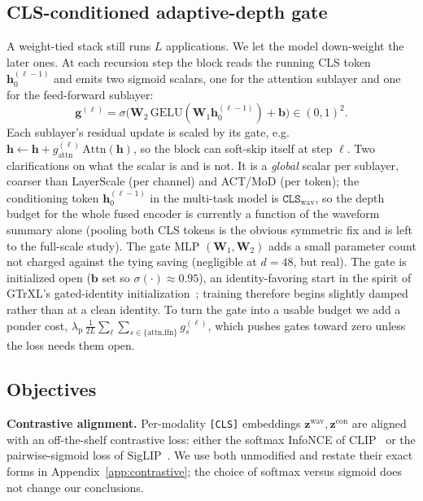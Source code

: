 \documentclass[conference]{IEEEtran}
\begin{document}
\subsection{CLS-conditioned adaptive-depth gate}
A weight-tied stack still runs $L$ applications. We let the model down-weight the
later ones. At each recursion step the block reads the running CLS token
$\bm{h}^{(\ell-1)}_{0}$ and emits two sigmoid scalars, one for the attention
sublayer and one for the feed-forward sublayer:
\begin{equation}
\bm{g}^{(\ell)} = \sigma\!\big(\mathbf{W}_2\,\mathrm{GELU}(\mathbf{W}_1 \bm{h}^{(\ell-1)}_{0}) + \bm{b}\big) \in (0,1)^2 .
\end{equation}
Each sublayer's residual update is scaled by its gate, e.g.
$\bm{h} \leftarrow \bm{h} + g^{(\ell)}_{\text{attn}}\,\mathrm{Attn}(\bm{h})$, so the
block can soft-skip itself at step $\ell$. Two clarifications on what the scalar
is and is not. It is a \emph{global} scalar per sublayer, coarser than LayerScale
(per channel) and ACT/MoD (per token); the conditioning token
$\bm{h}^{(\ell-1)}_{0}$ in the multi-task model is $\texttt{CLS}_{\text{wav}}$,
so the depth budget for the whole fused encoder is currently a function of the
waveform summary alone (pooling both CLS tokens is the obvious symmetric fix and is
left to the full-scale study). The gate MLP $(\mathbf{W}_1,\mathbf{W}_2)$ adds a
small parameter count not charged against the tying saving (negligible at
$d{=}48$, but real). The gate is initialized open ($\bm{b}$ set so
$\sigma(\cdot)\approx 0.95$), an identity-favoring start in the spirit of GTrXL's
gated-identity initialization~\cite{gtrxl}; training therefore begins slightly
damped rather than at a clean identity. To turn the gate into a usable budget we add a ponder cost,
$\lambda_{\text{p}}\,\frac{1}{2L}\sum_{\ell}\!\sum_{s\in\{\text{attn,ffn}\}} g^{(\ell)}_{s}$,
which pushes gates toward zero unless the loss needs them open.

\subsection{Objectives}
\textbf{Contrastive alignment.} Per-modality \texttt{[CLS]} embeddings
$\bm{z}^{\text{wav}}, \bm{z}^{\text{con}}$ are aligned with an off-the-shelf
contrastive loss: either the softmax InfoNCE of CLIP~\cite{clip} or the
pairwise-sigmoid loss of SigLIP~\cite{siglip}. We use both unmodified and restate
their exact forms in Appendix~\ref{app:contrastive}; the choice of softmax versus
sigmoid does not change our conclusions.
\end{document}
